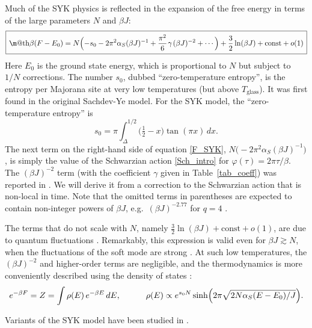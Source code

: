 \documentclass[12pt]{article}
\makeatletter
\newcommand*{\wideboxed}[1]{\setlength{\fboxsep}{1ex}%
  \fbox{\m@th$\displaystyle#1$}}
\newcommand{\const}{\mathrm{const}}
\newcommand{\vp}{\varphi}
\def\eg{e.g.\ }
\makeatother
\begin{document}
Much of the SYK physics is reflected in the expansion of the free energy in terms of the large parameters $N$ and $\beta J$:
\begin{equation}\label{F_SYK}
\wideboxed{
\beta(F-E_0)= N\Bigl(-s_0-2\pi^2\alpha_S(\beta J)^{-1}
+\frac{\pi^2}{6} \kern1pt\gamma\kern1pt (\beta J)^{-2}+\cdots\Bigr)
+\frac{3}{2}\ln(\beta J)+\const+o(1)
}
\end{equation}
Here $E_0$ is the ground state energy, which is proportional to $N$ but subject to $1/N$ corrections. The number $s_0$, dubbed ``zero-temperature entropy'', is the entropy per Majorana site at very low temperatures (but above $T_{\text{glass}}$). It was first found  \cite{GePaSa00} in the original Sachdev-Ye model. For the SYK model, the ``zero-temperature entropy'' is \cite{Kit.KITP, MS16} 
\begin{equation}
s_0=\pi\int_{\Delta}^{1/2}\bigl(\tfrac{1}{2}-x\bigr)\tan(\pi x)\,dx.
\end{equation}
The next term on the right-hand side of equation \eqref{F_SYK}, $N\bigl(-2\pi^2\alpha_S(\beta J)^{-1}\bigr)$, is simply the value of the Schwarzian action \eqref{Sch_intro} for $\vp(\tau)=2\pi\tau/\beta$. The $(\beta J)^{-2}$ term (with the coefficient $\gamma$ given in Table~\ref{tab_coeff}) was reported in \cite{randmat,JeSu16}. We will derive it from a correction to the Schwarzian action that is non-local in time. Note that the omitted terms in parentheses are expected to contain non-integer powers of $\beta J$, \eg $(\beta J)^{-2.77}$ for $q=4$ \cite{randmat}.

The terms that do not scale with $N$, namely $\frac{3}{2}\ln(\beta J)+\const+o(1)$, are due to quantum fluctuations \cite{MS16}. Remarkably, this expression is valid even for $\beta J\gtrsim N$, when the fluctuations of the soft mode are strong \cite{randmat, BaAlKa17,StWi17}. At such low temperatures, the $(\beta J)^{-2}$ and higher-order terms are negligible, and the thermodynamics is more conveniently described using the density of states \cite{randmat}:
\begin{equation}
e^{-\beta F}=Z=\int \rho(E)\,e^{-\beta E}\,dE,\qquad\quad
\rho(E)\propto e^{s_{0}N}\sinh\Bigl(2\pi\sqrt{2N\alpha_{S}(E-E_0)/J}\Bigr).
\end{equation}

Variants of the SYK model have been studied in \cite{Sach15, FuGaMaSa16, GrRo16, Wi16, KlGr16, Gu16, PeSpVo17}.
\end{document}
